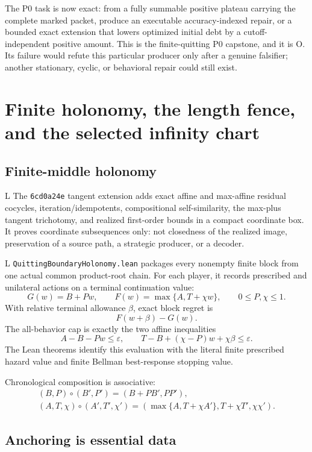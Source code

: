 \documentclass[11pt]{article}
\newcommand{\LTag}{\textsf{L}}
\newcommand{\OTag}{\textsf{O}}
\newcommand{\Prod}{\LTag}
\newcommand{\Open}{\OTag}
\newcommand{\Status}[1]{#1}
\begin{document}
The P0 task is now exact: from a fully summable positive plateau carrying the
complete marked packet, produce an executable accuracy-indexed repair, or a
bounded exact extension that lowers optimized initial debt by a
cutoff-independent positive amount.  This is the finite-quitting P0 capstone,
and it is \Status{\Open}.  Its failure would refute this particular producer
only after a genuine falsifier; another stationary, cyclic, or behavioral
repair could still exist.

\section{Finite holonomy, the length fence, and the selected infinity chart}

\subsection{Finite-middle holonomy}

\Status{\Prod} The \texttt{6cd0a24e} tangent extension adds exact affine and max-affine
residual cocycles, iteration/idempotents, compositional self-similarity, the
max-plus tangent trichotomy, and realized first-order bounds in a compact
coordinate box. It proves coordinate subsequences only: not closedness of the
realized image, preservation of a source path, a strategic producer, or a
decoder.

\Status{\Prod} \texttt{QuittingBoundaryHolonomy.lean} packages every nonempty
finite block from one actual common product-root chain.  For each player, it
records prescribed and unilateral actions on a terminal continuation value:
\[
 G(w)=B+Pw,\qquad F(w)=\max\{A,T+\chi w\},\qquad0\leq P,\chi\leq1.
\tag{14}
\]
With relative terminal allowance \(\beta\), exact block regret is
\[
 F(w+\beta)-G(w).
\tag{15}
\]
The all-behavior cap is exactly the two affine inequalities
\[
 A-B-Pw\leq\varepsilon,\qquad
 T-B+(\chi-P)w+\chi\beta\leq\varepsilon.
\tag{16}
\]
The Lean theorems identify this evaluation with the literal finite prescribed
hazard value and finite Bellman best-response stopping value.

Chronological composition is associative:
\[
\begin{array}{ll}
(B,P)\circ(B',P')=(B+PB',PP'),\\
(A,T,\chi)\circ(A',T',\chi')=
(\max\{A,T+\chi A'\},T+\chi T',\chi\chi').
\end{array}
\tag{17}
\]

\subsection{Anchoring is essential data}
\end{document}
